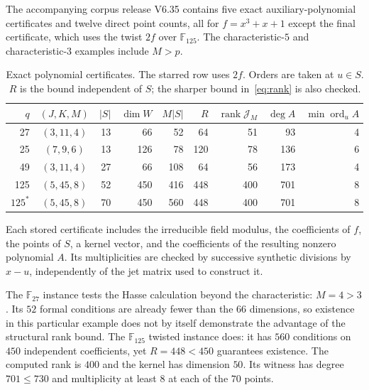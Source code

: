 \documentclass[11pt]{amsart}
\theoremstyle{definition}
\theoremstyle{remark}
\newcommand{\F}{\mathbb F}
\newcommand{\rank}{\operatorname{rank}}
\newcommand{\ord}{\operatorname{ord}}
\begin{document}
The accompanying corpus release V6.35 contains five exact auxiliary-polynomial certificates and twelve direct point counts, all for $f=x^3+x+1$ except the final certificate, which uses the twist $2f$ over $\F_{125}$. The characteristic-$5$ and characteristic-$3$ examples include $M>p$.

\begin{table}[ht]
\centering\footnotesize
\setlength{\tabcolsep}{4pt}
\begin{tabular}{rcrrrrrrr}
\toprule
$q$ & $(J,K,M)$ & $|S|$ & $\dim W$ & $M|S|$ & $R$ &
 $\rank\mathcal J_M$ & $\deg A$ & $\min\ord_u A$\\
\midrule
27 & $(3,11,4)$ & 13 & 66 & 52 & 64 & 51 & 93 & 4\\
25 & $(7,9,6)$ & 13 & 126 & 78 & 120 & 78 & 136 & 6\\
49 & $(3,11,4)$ & 27 & 66 & 108 & 64 & 56 & 173 & 4\\
125 & $(5,45,8)$ & 52 & 450 & 416 & 448 & 400 & 701 & 8\\
$125^\ast$ & $(5,45,8)$ & 70 & 450 & 560 & 448 & 400 & 701 & 8\\
\bottomrule
\end{tabular}
\caption{Exact polynomial certificates. The starred row uses $2f$. Orders are taken at $u\in S$. $R$ is the bound independent of $S$; the sharper bound in~\eqref{eq:rank} is also checked.}
\label{tab:certificates}
\end{table}

Each stored certificate includes the irreducible field modulus, the coefficients of $f$, the points of $S$, a kernel vector, and the coefficients of the resulting nonzero polynomial $A$. Its multiplicities are checked by successive synthetic divisions by $x-u$, independently of the jet matrix used to construct it.

The $\F_{27}$ instance tests the Hasse calculation beyond the characteristic: $M=4>3$. Its $52$ formal conditions are already fewer than the $66$ dimensions, so existence in this particular example does not by itself demonstrate the advantage of the structural rank bound. The $\F_{125}$ twisted instance does: it has $560$ conditions on $450$ independent coefficients, yet $R=448<450$ guarantees existence. The computed rank is $400$ and the kernel has dimension $50$. Its witness has degree $701\le730$ and multiplicity at least $8$ at each of the $70$ points.
\end{document}
